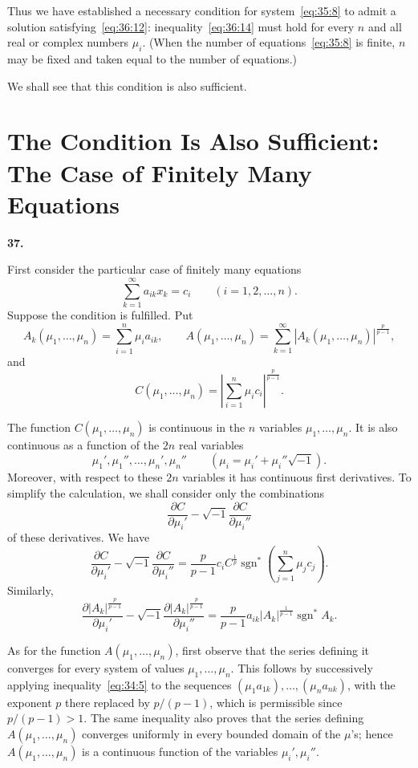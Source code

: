 \documentclass[
  paper=b5,
  fontsize=13pt,
  twoside=true,
  open=any,
  bookmarkpackage=false,
  chapterprefix=true,
  headings=normal
]{scrbook}
\theoremstyle{definition}
\newcommand{\numberedparagraph}[1]{%
  \par\medskip\phantomsection\label{sec:#1}%
  \noindent\textbf{#1.}\enspace
}
\begin{document}
Thus we have established a necessary condition for system~\eqref{eq:35:8} to admit a solution satisfying~\eqref{eq:36:12}: inequality~\eqref{eq:36:14} must hold for every $n$ and all real or complex numbers $\mu_i$. (When the number of equations~\eqref{eq:35:8} is finite, $n$ may be fixed and taken equal to the number of equations.)

We shall see that this condition is also sufficient.

\section{The Condition Is Also Sufficient: The Case of Finitely Many Equations}

\numberedparagraph{37}
First consider the particular case of finitely many equations
\begin{equation}
 \sum_{k=1}^{\infty}a_{ik}x_k=c_i
 \qquad(i=1,2,\ldots,n).
 \tag{15}\label{eq:37:15}
\end{equation}
Suppose the condition is fulfilled. Put
\[
 A_k(\mu_1,\ldots,\mu_n)=\sum_{i=1}^{n}\mu_i a_{ik},
 \qquad
 A(\mu_1,\ldots,\mu_n)
 =\sum_{k=1}^{\infty}|A_k(\mu_1,\ldots,\mu_n)|^{\frac{p}{p-1}},
\]
and
\[
 C(\mu_1,\ldots,\mu_n)
 =\left|\sum_{i=1}^{n}\mu_i c_i\right|^{\frac{p}{p-1}}.
\]

The function $C(\mu_1,\ldots,\mu_n)$ is continuous in the $n$ variables $\mu_1,\ldots,\mu_n$. It is also continuous as a function of the $2n$ real variables
\[
 \mu_1',\mu_1'',\ldots,\mu_n',\mu_n''
 \qquad(\mu_i=\mu_i'+\mu_i''\sqrt{-1}).
\]
Moreover, with respect to these $2n$ variables it has continuous first derivatives. To simplify the calculation, we shall consider only the combinations
\[
 \frac{\partial C}{\partial\mu_i'}
 -\sqrt{-1}\frac{\partial C}{\partial\mu_i''}
\]
of these derivatives. We have
\begin{equation}
 \frac{\partial C}{\partial\mu_i'}
 -\sqrt{-1}\frac{\partial C}{\partial\mu_i''}
 =\frac{p}{p-1}c_i C^{\frac1p}
  \operatorname{sgn}^{*}\!\left(\sum_{j=1}^{n}\mu_jc_j\right).
 \tag{16}\label{eq:37:16}
\end{equation}
Similarly,
\begin{equation}
 \frac{\partial |A_k|^{\frac{p}{p-1}}}{\partial\mu_i'}
 -\sqrt{-1}\frac{\partial |A_k|^{\frac{p}{p-1}}}{\partial\mu_i''}
 =\frac{p}{p-1}a_{ik}|A_k|^{\frac1{p-1}}
  \operatorname{sgn}^{*}A_k.
 \tag{17}\label{eq:37:17}
\end{equation}

As for the function $A(\mu_1,\ldots,\mu_n)$, first observe that the series defining it converges for every system of values $\mu_1,\ldots,\mu_n$. This follows by successively applying inequality~\eqref{eq:34:5} to the sequences $(\mu_1a_{1k}),\ldots,(\mu_na_{nk})$, with the exponent $p$ there replaced by $p/(p-1)$, which is permissible since $p/(p-1)>1$. The same inequality also proves that the series defining $A(\mu_1,\ldots,\mu_n)$ converges uniformly in every bounded domain of the $\mu$'s; hence $A(\mu_1,\ldots,\mu_n)$ is a continuous function of the variables $\mu_i',\mu_i''$.
\end{document}
